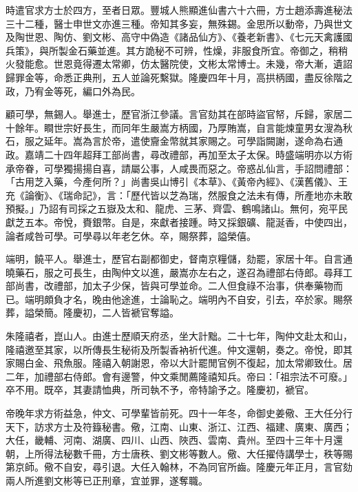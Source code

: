 \begin{pinyinscope}
時遣官求方士於四方，至者日眾。豐城人熊顯進仙書六十六冊，方士趙添壽進秘法三十二種，醫士申世文亦進三種。帝知其多妄，無殊錫。金思所以動帝，乃與世文及陶世恩、陶仿、劉文彬、高守中偽造《諸品仙方》、《養老新書》、《七元天禽護國兵策》，與所製金石藥並進。其方詭秘不可辨，性燥，非服食所宜。帝御之，稍稍火發能愈。世恩竟得遷太常卿，仿太醫院使，文彬太常博士。未幾，帝大漸，遺詔歸罪金等，命悉正典刑，五人並論死繫獄。隆慶四年十月，高拱柄國，盡反徐階之政，乃宥金等死，編口外為民。

顧可學，無錫人。舉進士，歷官浙江參議。言官劾其在部時盜官帑，斥歸，家居二十餘年。瞷世宗好長生，而同年生嚴嵩方柄國，乃厚賄嵩，自言能煉童男女溲為秋石，服之延年。嵩為言於帝，遣使齎金幣就其家賜之。可學詣闕謝，遂命為右通政。嘉靖二十四年超拜工部尚書，尋改禮部，再加至太子太保。時盛端明亦以方術承帝眷，可學獨揚揚自喜，請屬公事，人咸畏而惡之。帝惑乩仙言，手詔問禮部：「古用芝入藥，今產何所？」尚書吳山博引《本草》、《黃帝內經》、《漢舊儀》、王充《論衡》、《瑞命記》，言：「歷代皆以芝為瑞，然服食之法未有傳，所產地亦未敢預擬。」乃詔有司採之五嶽及太和、龍虎、三茅、齊雲、鶴鳴諸山。無何，宛平民獻芝五本。帝悅，賚銀幣。自是，來獻者接踵。時又採銀礦、龍涎香，中使四出，論者咸咎可學。可學尋以年老乞休。卒，賜祭葬，謚榮僖。

端明，饒平人。舉進士，歷官右副都御史，督南京糧儲，劾罷，家居十年。自言通曉藥石，服之可長生，由陶仲文以進，嚴嵩亦左右之，遂召為禮部右侍郎。尋拜工部尚書，改禮部，加太子少保，皆與可學並命。二人但食祿不治事，供奉藥物而已。端明頗負才名，晚由他途進，士論恥之。端明內不自安，引去，卒於家。賜祭葬，謚榮簡。隆慶初，二人皆褫官奪謚。

朱隆禧者，崑山人。由進士歷順天府丞，坐大計黜。二十七年，陶仲文赴太和山，隆禧邀至其家，以所傳長生秘術及所製香衲祈代進。仲文還朝，奏之。帝悅，即其家賜白金、飛魚服。隆禧入朝謝恩，帝以大計罷閒官例不復起，加太常卿致仕。居二年，加禮部右侍郎。會有邊警，仲文乘閒薦隆禧知兵。帝曰：「祖宗法不可廢。」卒不用。既卒，其妻請恤典，所司執不予，帝特諭予之。隆慶初，褫官。

帝晚年求方術益急，仲文、可學輩皆前死。四十一年冬，命御史姜儆、王大任分行天下，訪求方士及符籙秘書。儆，江南、山東、浙江、江西、福建、廣東、廣西；大任，畿輔、河南、湖廣、四川、山西、陜西、雲南、貴州。至四十三年十月還朝，上所得法秘數千冊，方士唐秩、劉文彬等數人。儆、大任擢侍講學士，秩等賜第京師。儆不自安，尋引退。大任入翰林，不為同官所齒。隆慶元年正月，言官劾兩人所進劉文彬等已正刑章，宜並罪，遂奪職。


\end{pinyinscope}